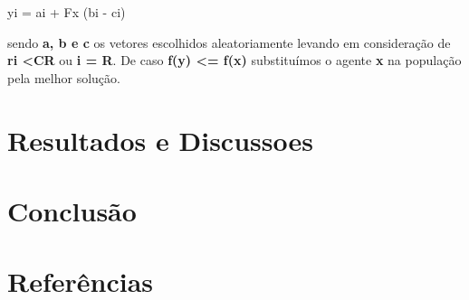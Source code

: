 \documentclass[a4paper, 12pt]{article}
\begin{document}
 yi = ai + Fx (bi - ci)%

 sendo \textbf{a, b e c} os vetores escolhidos aleatoriamente levando em consideração de \textbf{ri <CR} ou  \textbf{i = R}. De caso \textbf{f(y) <= f(x)} substituímos o agente \textbf{x} na população pela melhor solução.
 
 
\section{Resultados e Discussoes}

\section{Conclusão}

\section{Referências}
\end{document}
